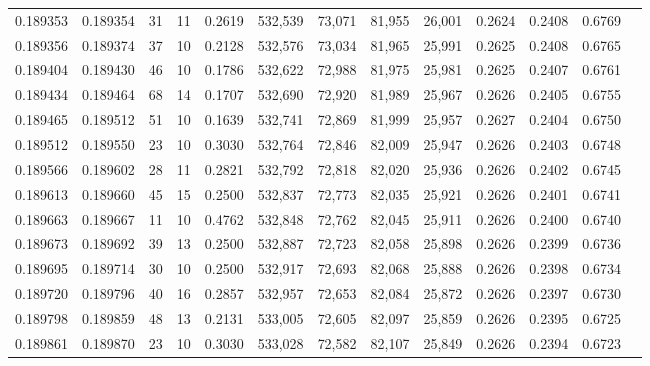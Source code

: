 \begin{tabular}{rrrrrrrrrrrrr}
0.189353 & 0.189354 &    31 &  11 &                                     0.2619 & 532,539 &  73,071 &  81,955 &  26,001 & 0.2624 & 0.2408 & 0.6769 \\
0.189356 & 0.189374 &    37 &  10 &                                     0.2128 & 532,576 &  73,034 &  81,965 &  25,991 & 0.2625 & 0.2408 & 0.6765 \\
0.189404 & 0.189430 &    46 &  10 &                                     0.1786 & 532,622 &  72,988 &  81,975 &  25,981 & 0.2625 & 0.2407 & 0.6761 \\
0.189434 & 0.189464 &    68 &  14 &                                     0.1707 & 532,690 &  72,920 &  81,989 &  25,967 & 0.2626 & 0.2405 & 0.6755 \\
0.189465 & 0.189512 &    51 &  10 &                                     0.1639 & 532,741 &  72,869 &  81,999 &  25,957 & 0.2627 & 0.2404 & 0.6750 \\
0.189512 & 0.189550 &    23 &  10 &                                     0.3030 & 532,764 &  72,846 &  82,009 &  25,947 & 0.2626 & 0.2403 & 0.6748 \\
0.189566 & 0.189602 &    28 &  11 &                                     0.2821 & 532,792 &  72,818 &  82,020 &  25,936 & 0.2626 & 0.2402 & 0.6745 \\
0.189613 & 0.189660 &    45 &  15 &                                     0.2500 & 532,837 &  72,773 &  82,035 &  25,921 & 0.2626 & 0.2401 & 0.6741 \\
0.189663 & 0.189667 &    11 &  10 &                                     0.4762 & 532,848 &  72,762 &  82,045 &  25,911 & 0.2626 & 0.2400 & 0.6740 \\
0.189673 & 0.189692 &    39 &  13 &                                     0.2500 & 532,887 &  72,723 &  82,058 &  25,898 & 0.2626 & 0.2399 & 0.6736 \\
0.189695 & 0.189714 &    30 &  10 &                                     0.2500 & 532,917 &  72,693 &  82,068 &  25,888 & 0.2626 & 0.2398 & 0.6734 \\
0.189720 & 0.189796 &    40 &  16 &                                     0.2857 & 532,957 &  72,653 &  82,084 &  25,872 & 0.2626 & 0.2397 & 0.6730 \\
0.189798 & 0.189859 &    48 &  13 &                                     0.2131 & 533,005 &  72,605 &  82,097 &  25,859 & 0.2626 & 0.2395 & 0.6725 \\
0.189861 & 0.189870 &    23 &  10 &                                     0.3030 & 533,028 &  72,582 &  82,107 &  25,849 & 0.2626 & 0.2394 & 0.6723 \\

\end{tabular}
